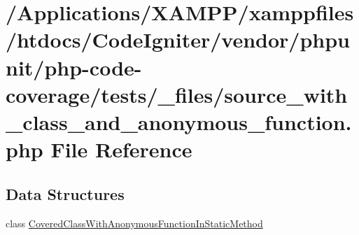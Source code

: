\hypertarget{source__with__class__and__anonymous__function_8php}{}\section{/\+Applications/\+X\+A\+M\+P\+P/xamppfiles/htdocs/\+Code\+Igniter/vendor/phpunit/php-\/code-\/coverage/tests/\+\_\+files/source\+\_\+with\+\_\+class\+\_\+and\+\_\+anonymous\+\_\+function.php File Reference}
\label{source__with__class__and__anonymous__function_8php}
\subsection*{Data Structures}
\begin{DoxyCompactItemize}
\item 
class \mbox{\hyperlink{class_covered_class_with_anonymous_function_in_static_method}{Covered\+Class\+With\+Anonymous\+Function\+In\+Static\+Method}}
\end{DoxyCompactItemize}
